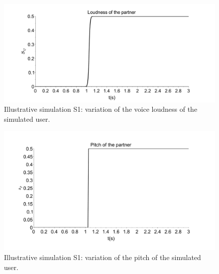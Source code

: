 
\begin{figure}
  \centering
  \includegraphics[width=\linewidth]{figure/loudness_simulated_partner.pdf}
  \caption{Illustrative simulation S1: variation of the voice loudness of the simulated user.}
  \label{fig-volume-user1}
\end{figure}

\begin{figure}%
  \centering
  \includegraphics[width=\linewidth]{figure/Pitch_partenaire.pdf}
  \caption{Illustrative simulation S1: variation of the pitch of the simulated user.}
  \label{fig-pitch-user1}
\end{figure}

